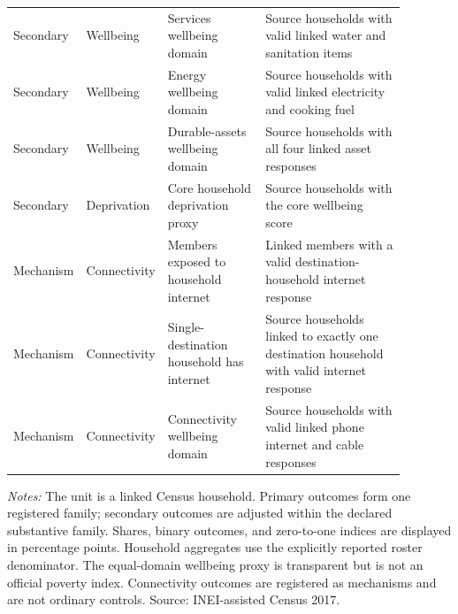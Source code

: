\begin{longtable}{@{}>{\raggedright\arraybackslash}p{0.10\linewidth}p{0.17\linewidth}p{0.25\linewidth}p{0.36\linewidth}@{}}
Secondary & Wellbeing & Services wellbeing domain & Source households with valid linked water and sanitation items \\
Secondary & Wellbeing & Energy wellbeing domain & Source households with valid linked electricity and cooking fuel \\
Secondary & Wellbeing & Durable-assets wellbeing domain & Source households with all four linked asset responses \\
Secondary & Deprivation & Core household deprivation proxy & Source households with the core wellbeing score \\
Mechanism & Connectivity & Members exposed to household internet & Linked members with a valid destination-household internet response \\
Mechanism & Connectivity & Single-destination household has internet & Source households linked to exactly one destination household with valid internet response \\
Mechanism & Connectivity & Connectivity wellbeing domain & Source households with valid linked phone internet and cable responses \\
\bottomrule\end{longtable}
\begin{minipage}{0.98\linewidth}\footnotesize\textit{Notes:} The unit is a linked Census household. Primary outcomes form one registered family; secondary outcomes are adjusted within the declared substantive family. Shares, binary outcomes, and zero-to-one indices are displayed in percentage points. Household aggregates use the explicitly reported roster denominator. The equal-domain wellbeing proxy is transparent but is not an official poverty index. Connectivity outcomes are registered as mechanisms and are not ordinary controls. Source: INEI-assisted Census 2017.\end{minipage}
\par{}\par\endgroup

